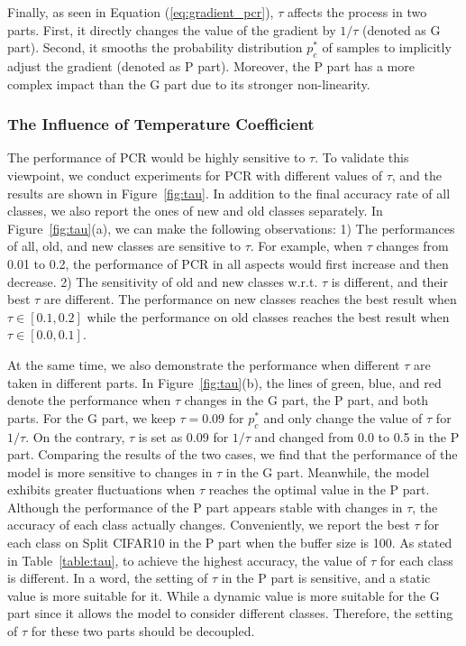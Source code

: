 Finally, as seen in Equation (\ref{eq:gradient_pcr}), $\tau$ affects the process in two parts. First, it directly changes the value of the gradient by ${1}/{\tau}$ (denoted as G part). Second, it smooths the probability distribution $p^*_c$ of samples to implicitly adjust the gradient (denoted as P part). Moreover, the P part has a more complex impact than the G part due to its stronger non-linearity. 

\subsubsection{The Influence of Temperature Coefficient}
The performance of PCR would be highly sensitive to $\tau$. To validate this viewpoint, we conduct experiments for PCR with different values of $\tau$, and the results are shown in Figure~\ref{fig:tau}.
In addition to the final accuracy rate of all classes, we also report the ones of new and old classes separately. In Figure~\ref{fig:tau}(a), we can make the following observations: 1) The performances of all, old, and new classes are sensitive to $\tau$. For example, when $\tau$ changes from 0.01 to 0.2, the performance of PCR in all aspects would first increase and then decrease. 2) The sensitivity of old and new classes w.r.t. $\tau$ is different, and their best $\tau$ are different. The performance on new classes reaches the best result when $\tau\in[0.1,0.2]$ while the performance on old classes reaches the best result when $\tau\in[0.0,0.1]$. 

At the same time, we also demonstrate the performance when different $\tau$ are taken in different parts. In Figure~\ref{fig:tau}(b), the lines of green, blue, and red denote the performance when $\tau$ changes in the G part, the P part, and both parts. For the G part, we keep $\tau=0.09$ for $p^*_c$ and only change the value of $\tau$ for ${1}/{\tau}$. On the contrary, $\tau$ is set as 0.09 for ${1}/{\tau}$ and changed from 0.0 to 0.5 in the P part. Comparing the results of the two cases, we find that the performance of the model is more sensitive to changes in $\tau$ in the G part. Meanwhile, the model exhibits greater fluctuations when $\tau$ reaches the optimal value in the P part. Although the performance of the P part appears stable with changes in $\tau$, the accuracy of each class actually changes. Conveniently, we report the best $\tau$ for each class on Split CIFAR10 in the P part when the buffer size is 100. As stated in Table~\ref{table:tau}, to achieve the highest accuracy, the value of $\tau$ for each class is different. In a word, the setting of $\tau$ in the P part is sensitive, and a static value is more suitable for it. While a dynamic value is more suitable for the G part since it allows the model to consider different classes. Therefore, the setting of $\tau$ for these two parts should be decoupled.

